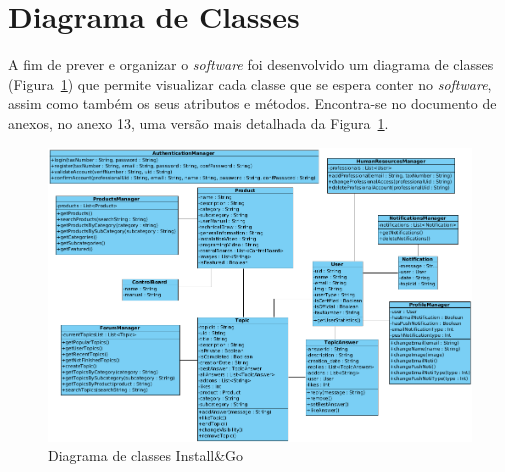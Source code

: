 \section{Diagrama de Classes}

A fim de prever e organizar o \textit{software} foi desenvolvido um diagrama de classes (Figura~\ref{fig:22}) que permite visualizar cada classe que se espera conter no \textit{software}, assim como também os seus atributos e métodos. Encontra-se no documento de anexos, no anexo 13, uma versão mais detalhada da Figura~\ref*{fig:22}.

\begin{figure}[htb]
  \centering
  
  \includegraphics[width=\textwidth]{images/diagramas/diagrama_classes.png}
  \caption{Diagrama de classes Install\&Go}
  \label{fig:22}
\end{figure}
